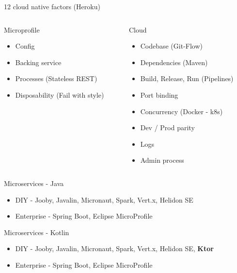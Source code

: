\documentclass[aspectratio=169]{beamer}
\begin{document}
\begin{frame}{12 cloud native factors (Heroku)}

\begin{columns}[T] %
	
	\begin{column}[T]{4cm} %
		\begin{alertblock}{Microprofile}
			\begin{itemize}
				\item Config
				\item Backing service
				\item Processes (Stateless REST)
				\item Disposability (Fail with style)
			\end{itemize}
		\end{alertblock}
	\end{column}
	\begin{column}[T]{6cm} %
		\begin{block}{Cloud}
			\begin{itemize}
				\item Codebase (Git-Flow)
				\item Dependencies (Maven)
				\item Build, Release, Run (Pipelines)
				\item Port binding
				\item Concurrency (Docker - k8s)
				\item Dev / Prod parity
				\item Logs
				\item Admin process
			\end{itemize}
		\end{block}
	\end{column}
\end{columns}

\end{frame}


\begin{frame}{Microservices - Java}
\begin{itemize}
	\item DIY - Jooby, Javalin, Micronaut, Spark, Vert.x, Helidon SE
	\item Enterprise - Spring Boot, Eclipse MicroProfile
\end{itemize}
\end{frame}

\begin{frame}{Microservices - Kotlin}
\begin{itemize}
	\item DIY - Jooby, Javalin, Micronaut, Spark, Vert.x, Helidon SE, \textbf{Ktor}
	\item Enterprise - Spring Boot, Eclipse MicroProfile
\end{itemize}
\end{frame}
\end{document}
